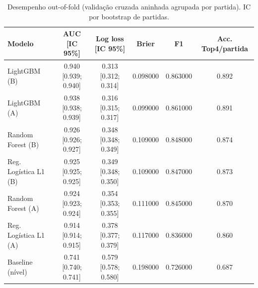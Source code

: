 \begin{table}[htbp]
\caption{Desempenho out-of-fold (validação cruzada aninhada agrupada por partida). IC por bootstrap de partidas.}
\label{tab:metricas}
\centering
\small
\begin{tabular}{lccccc}
\toprule
Modelo & AUC [IC 95\%] & Log loss [IC 95\%] & Brier & F1 & Acc. Top4/partida \\
\midrule
LightGBM (B) & 0.940 [0.939; 0.940] & 0.313 [0.312; 0.314] & 0.098000 & 0.863000 & 0.892 \\
LightGBM (A) & 0.938 [0.938; 0.939] & 0.316 [0.315; 0.317] & 0.099000 & 0.861000 & 0.891 \\
Random Forest (B) & 0.926 [0.926; 0.927] & 0.348 [0.348; 0.349] & 0.109000 & 0.848000 & 0.874 \\
Reg. Logística L1 (B) & 0.925 [0.925; 0.925] & 0.349 [0.348; 0.350] & 0.109000 & 0.847000 & 0.873 \\
Random Forest (A) & 0.924 [0.923; 0.924] & 0.354 [0.353; 0.355] & 0.111000 & 0.845000 & 0.870 \\
Reg. Logística L1 (A) & 0.914 [0.914; 0.915] & 0.378 [0.377; 0.379] & 0.117000 & 0.836000 & 0.860 \\
Baseline (nível) & 0.741 [0.740; 0.741] & 0.579 [0.578; 0.580] & 0.198000 & 0.726000 & 0.687 \\
\bottomrule
\end{tabular}
\end{table}
